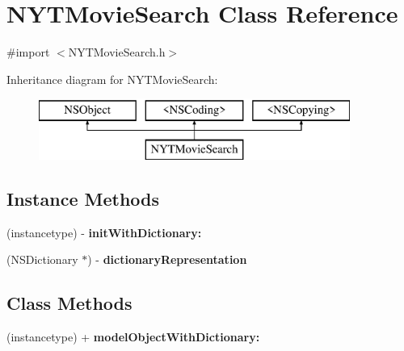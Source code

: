 \section{N\+Y\+T\+Movie\+Search Class Reference}
\label{interface_n_y_t_movie_search}


{\ttfamily \#import $<$N\+Y\+T\+Movie\+Search.\+h$>$}

Inheritance diagram for N\+Y\+T\+Movie\+Search\+:\begin{figure}[H]
\begin{center}
\leavevmode
\includegraphics[height=2.000000cm]{interface_n_y_t_movie_search}
\end{center}
\end{figure}
\subsection*{Instance Methods}
\begin{DoxyCompactItemize}
\item 
(instancetype) -\/ {\bfseries init\+With\+Dictionary\+:}\label{interface_n_y_t_movie_search_ae5cdd56eecfa427ca17cbe8d356da529}

\item 
(N\+S\+Dictionary $\ast$) -\/ {\bfseries dictionary\+Representation}\label{interface_n_y_t_movie_search_aa1ab6487850a509f7dc868f21e69813d}

\end{DoxyCompactItemize}
\subsection*{Class Methods}
\begin{DoxyCompactItemize}
\item 
(instancetype) + {\bfseries model\+Object\+With\+Dictionary\+:}\label{interface_n_y_t_movie_search_a5a5dbd8b37ab407784da99b6cf26e1fb}

\end{DoxyCompactItemize}
